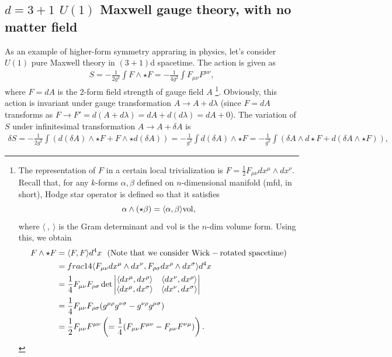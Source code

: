 \documentclass{ltjsarticle}
\theoremstyle{mystyle} %
\numberwithin{equation}{section}
\begin{document}
\subsection{$d=3+1$ $U(1)$ Maxwell gauge theory, with no matter field}
As an example of higher-form symmetry appraring in physics, let's consider $U(1)$ pure Maxwell theory in $(3+1)$d spacetime. 
The action is given as 
\begin{align}
    S = -\frac{1}{2g^2} \int F\wedge \star F = -\frac{1}{4g^2}\int F_{\mu\nu}F^{\mu\nu}, 
\end{align}
where $F=dA$ is the 2-form field strength of gauge field $A$
\footnote{
    The representation of $F$ in a certain local trivialization is $F=\frac{1}{2}F_{\mu\nu}dx^\mu \wedge dx^\nu$. 
    Recall that, for any $k$-forms $\alpha, \beta$ defined on $n$-dimensional manifold (mfd, in short), 
    Hodge star operator is defined so that it satisfies
    $$\alpha\wedge (\star \beta)=\langle{\alpha, \beta}\rangle\mathrm{vol}, $$
    where $\langle ~ , ~ \rangle$ is the Gram determinant and $\mathrm{vol}$ is the $n$-dim volume form. 
    Using this, we obtain
    \begin{align}
        F\wedge \star F &= \langle{F, F}\rangle d^4 x~~(\mathrm{Note~that~we~consider~Wick-rotated~spacetime})\\
        &=frac{1}{4}\langle{F_{\mu\nu}dx^\mu\wedge dx^\nu, F_{\rho\sigma}dx^\rho\wedge dx^\sigma}\rangle d^4 x\\
        &=\frac{1}{4}F_{\mu\nu}F_{\rho\sigma}\det
        \begin{vmatrix}
            \langle{dx^\mu, dx^\rho}\rangle & \langle{dx^\nu, dx^\rho}\rangle\\
            \langle{dx^\mu, dx^\sigma}\rangle & \langle{dx^\nu, dx^\sigma}\rangle\\
        \end{vmatrix}\\
        &= \frac{1}{4}F_{\mu\nu}F_{\rho\sigma}(g^{\mu\rho}g^{\nu\sigma}-g^{\nu\rho}g^{\mu\sigma})\\
        &= \frac{1}{2}F_{\mu\nu}F^{\mu\nu} \left({=\frac{1}{4}(F_{\mu\nu}F^{\mu\nu}-F_{\mu\nu}F^{\nu\mu})}\right). 
    \end{align}
}. Obviously, this action is invariant under gauge transformation $A\to A+d\lambda$ (since $F=dA$ transforms as 
$F\to F' = d(A+d\lambda) = dA + d(d\lambda) = dA +0$). 
The variation of $S$ under infinitesimal transformation $A\to A + \delta A$ is 
\begin{align}
    \delta S= -\frac{1}{2g^2}\int (d(\delta A)\wedge \star F + F\wedge \star d(\delta A) )
    =-\frac{1}{g^2} \int d(\delta A)\wedge \star F 
    =-\frac{1}{g^2}\int (\delta A \wedge d \star F + d(\delta A \wedge \star F)), 
\end{align}
\end{document}
